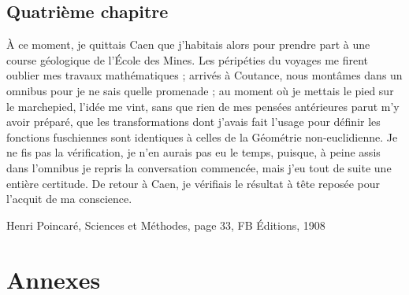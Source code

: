 \documentclass[a4paper, 11pt]{report}
\begin{document}
\chapter{Quatrième chapitre}
\epigraph{À ce moment, je quittais Caen que j'habitais alors pour prendre part à une course géologique de l'École des Mines. Les péripéties du voyages me firent oublier mes travaux mathématiques ; arrivés à Coutance, nous montâmes dans un omnibus pour je ne sais quelle promenade ; au moment où je mettais le pied sur le marchepied, l'idée me vint, sans que rien de mes pensées antérieures parut m'y avoir préparé, que les transformations dont j'avais fait l'usage pour définir les fonctions fuschiennes sont identiques à celles de la Géométrie non-euclidienne. Je ne fis pas la vérification, je n'en aurais pas eu le temps, puisque, à peine assis dans l'omnibus je repris la conversation commencée, mais j'eu tout de suite une entière certitude. De retour à Caen, je vérifiais le résultat à tête reposée pour l'acquit de ma conscience.}{Henri Poincaré, Sciences et Méthodes, page 33, FB Éditions, 1908}

\part*{Annexes}


\end{document}
